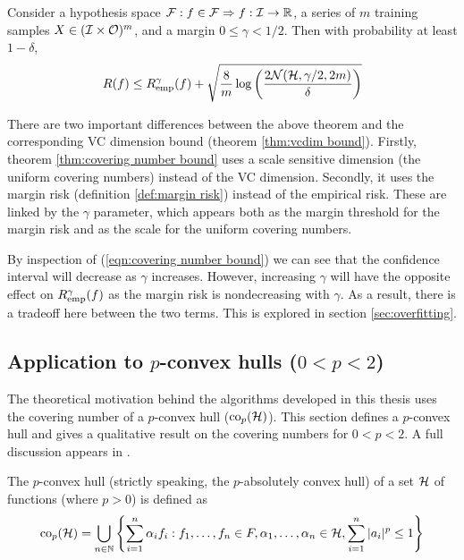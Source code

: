 \begin{theorem}
\label{thm:covering number bound}
Consider a hypothesis space $\mathcal{F} : f \in \mathcal{F} \Rightarrow f : \mathcal{I}
\rightarrow \mathbb{R}$, a series of $m$ training samples $X \in
(\mathcal{I} \times \mathcal{O})^m$, and a margin $0 \leq \gamma < 1/2$.  Then
with probability at least $1 - \delta$,  
\begin{equation}
R(f) \leq R_{\mathrm{emp}}^{\gamma}(f) + \sqrt{\frac{8}{m} \log \left( \frac{2
\mathcal{N}({\mathcal{H}}, {\gamma/2}, {2m})}{\delta} \right)}
\label{eqn:covering number bound}
\end{equation}
\end{theorem}

There are two important differences between the above theorem and the
corresponding VC dimension bound (theorem \ref{thm:vcdim bound}). 
Firstly, theorem \ref{thm:covering number bound} uses a scale
sensitive dimension (the uniform covering numbers) instead of the VC
dimension.  Secondly, it uses the margin risk (definition
\ref{def:margin risk}) instead of the empirical risk.  These are linked
by the $\gamma$ parameter, which appears both as the margin threshold
for the margin risk and as the scale for the uniform covering numbers.

By inspection of (\ref{eqn:covering number bound}) we can see that the
confidence interval will decrease as $\gamma$ increases.  However,
increasing $\gamma$ will have the opposite effect on
$R_{\mathrm{emp}}^{\gamma}(f)$ as the margin risk is nondecreasing with
$\gamma$.  As a result, there is a tradeoff here between the two
terms.  This is explored in section \ref{sec:overfitting}.

\subsection{Application to $p$-convex hulls ($0 < p < 2$)}
\label{sec:p-convex}

The theoretical motivation behind the algorithms developed in this
thesis uses the covering number of a $p$-convex hull ($\mathrm{co}_p(\mathcal{H})$).
This section defines a $p$-convex hull and gives a qualitative result
on the covering numbers for $0 < p < 2$.  A full discussion appears in
\cite{Williamson99}.

\begin{definition}
The $p$-convex hull (strictly speaking, the $p$-absolutely convex hull) of
a set $\mathcal{H}$ of functions (where $p>0$) is defined as
%
\begin{equation}
\mathrm{co}_p (\mathcal{H}) =
 \bigcup _{n \in \mathbb{N}}
\left\{
 \sum_{i=1}^{n}
 \alpha _i
f_i : f_1, \ldots, f_n \in F,
 \alpha _1, \ldots, \alpha _n \in \mathbb{\mathcal{H}},
 \sum_{i=1}^{n} | a_i |^p \leq 1
\right\}
\end{equation}
\end{definition}

